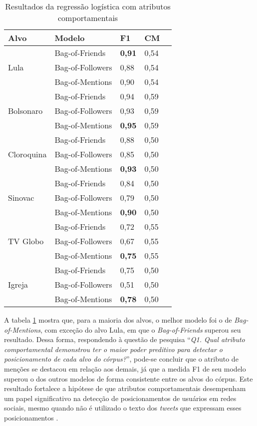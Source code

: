 \documentclass[
	12pt, oneside, a4paper, english, brazil
]{abntex2ppgsi}
\begin{document}
\begin{table}[ht]
\centering
\caption{Resultados da regressão logística com atributos comportamentais}
\label{tab:f1-macro-avg}
\begin{tabular}{ lllll }
\hline
Alvo & Modelo & F1 & CM \\
\hline
\multirow{3}{*}{Lula} & Bag-of-Friends & \textbf{0,91} & 0,54 \\
& Bag-of-Followers & 0,88 & 0,54 \\
& Bag-of-Mentions & 0,90 & 0,54 \\ \hline
\multirow{3}{*}{Bolsonaro} & Bag-of-Friends & 0,94 & 0,59 \\
& Bag-of-Followers & 0,93 & 0,59 \\
& Bag-of-Mentions & \textbf{0,95} & 0,59 \\ \hline
\multirow{3}{*}{Cloroquina} & Bag-of-Friends & 0,88 & 0,50 \\
& Bag-of-Followers & 0,85 & 0,50 \\
& Bag-of-Mentions & \textbf{0,93} & 0,50 \\ \hline
\multirow{3}{*}{Sinovac} & Bag-of-Friends & 0,84 & 0,50 \\
& Bag-of-Followers & 0,79 & 0,50 \\
& Bag-of-Mentions & \textbf{0,90} & 0,50 \\ \hline
\multirow{3}{*}{TV Globo} & Bag-of-Friends & 0,72 & 0,55 \\
& Bag-of-Followers & 0,67 & 0,55 \\
& Bag-of-Mentions & \textbf{0,75} & 0,55 \\ \hline
\multirow{3}{*}{Igreja} & Bag-of-Friends & 0,75 & 0,50 \\
& Bag-of-Followers & 0,51 & 0,50 \\
& Bag-of-Mentions & \textbf{0,78} & 0,50 \\ \hline
\end{tabular}
\end{table}

A tabela \ref{tab:f1-macro-avg} mostra que, para a maioria dos alvos, o melhor modelo foi o de {\em Bag-of-Mentions}, com exceção do alvo Lula, em que o {\em Bag-of-Friends} superou seu resultado. Dessa forma, respondendo à questão de pesquisa ``{\em Q1. Qual atributo comportamental demonstrou ter o maior poder preditivo para detectar o posicionamento de cada alvo do córpus?}'', pode-se concluir que o atributo de menções se destacou em relação aos demais, já que a medida F1 de seu modelo superou o dos outros modelos de forma consistente entre os alvos do córpus. Este resultado fortalece a hipótese de que atributos comportamentais desempenham um papel significativo na detecção de posicionamentos de usuários em redes sociais, mesmo quando não é utilizado o texto dos {\em tweets} que expressam esses posicionamentos \cite{tahar2017, espinosa2020deepreading, isisisnotislam, andrew2019}. 
 
\end{document}

